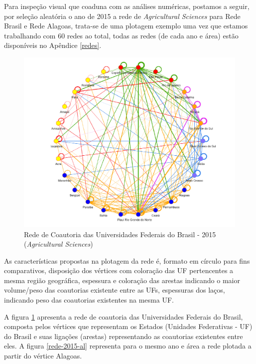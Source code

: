 Para inspeção visual que coaduna com as análises numéricas, postamos a seguir, por seleção aleatória o ano de 2015 a rede de \textit{Agricultural Sciences} para Rede Brasil e Rede Alagoas, trata-se de uma plotagem exemplo uma vez que estamos trabalhando com 60 redes ao total, todas as redes (de cada ano e área) estão disponíveis no Apêndice \ref{redes}.


\begin{figure}[H]
\centering
\includegraphics[scale=0.6]{Imagens/rede-agr-br-2015.pdf}
\caption{Rede de Coautoria das Universidades Federais do Brasil - 2015 (\textit{Agricultural Sciences})}
\label{rede-2015-br}
\end{figure}

As características propostas na plotagem da rede é, formato em círculo para fins comparativos, disposição dos vértices com coloração das UF pertencentes a mesma região geográfica, espessura e coloração das arestas indicando o maior volume/peso das coautorias existente entre as UFs, espessuras dos laços, indicando peso das coautorias existentes na mesma UF.

A figura \ref{rede-2015-br} apresenta a rede de coautoria das Universidades Federais do Brasil, composta pelos vértices que representam os Estados (Unidades Federativas - UF) do Brasil e suas ligações (arestas) representando as coautorias existentes entre eles. A figura \ref{rede-2015-al} representa para o mesmo ano e área a rede plotada a partir do vértice Alagoas.

